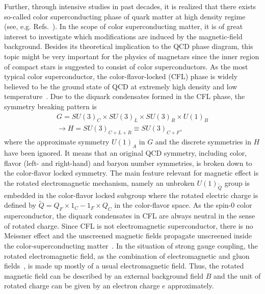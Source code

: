 Further, through intensive studies in past decades, it is realized that there exists so-called color
superconducting phase of quark matter at high density regime (see, e.g.
Refs.~\cite{alford2004dense,buballa2005njl}). In the scope of color superconducting matter, it is of
great interest to investigate which modifications are induced by the magnetic-field background.
Besides its theoretical implication to the QCD phase diagram, this topic might be very important for the physics of magnetars since 
the inner region of compact stars is suggested to consist of color superconductors.
As the most typical color superconductor, the color-flavor-locked (CFL) phase is widely believed to be
the ground state of QCD at extremely high density and low temperature~\cite{alford1998qcd}. Due to the
diquark condensates formed in the CFL phase, the symmetry breaking pattern is
\begin{eqnarray}
G=SU(3)_{C}\times SU(3)_{L} \nonumber
\times SU(3)_{R}\times U(1)_{B} \\
\rightarrow H=SU(3)_{C+L+R}\equiv SU(3)_{C+F},\label{cfl}
\end{eqnarray}
where the approximate symmetry $U(1)_{A}$ in $G$ and the discrete symmetries in $H$ have been ignored.
It means that an original QCD symmetry, including color, flavor (left- and right-hand) and baryon number
symmetries, is broken down to the color-flavor locked symmetry.
The main feature relevant for magnetic effect is the rotated electromagnetic mechanism, namely an unbroken
$U(1)_{\widetilde{Q}}$ group is embedded in the color-flavor locked subgroup where the rotated electric
charge is defined by $\widetilde{Q}=Q_{F}\times {1}_{C}-{1}_{F}\times Q_{C}$ in the color-flavor space.
As the spin-$0$ color superconductor, the diquark condensates in CFL are always neutral in the sense of
rotated charge.
Since CFL is not electromagnetic superconductor, there is no Meissner effect and the unscreened magnetic
fields propagate unscreened inside the color-superconducting matter~\cite{alford1998qcd,alford2000magnetic}.
In the situation of strong gauge coupling, the rotated electromagnetic field, as the combination of
electromagnetic and gluon fields~\cite{alford1998qcd,alford2000magnetic}, is made up mostly of a usual
electromagnetic field. Thus, the rotated magnetic field can be described by an external background field
$B$ and the unit of rotated charge can be given by an electron charge $e$ approximately.

